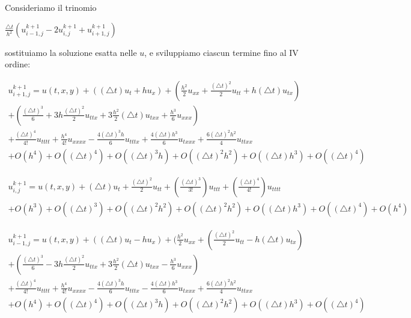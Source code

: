 \documentclass[]{article}
\begin{document}
Consideriamo il trinomio
\begin{center}
	$\frac{\bigtriangleup t}{h^2} (u^{k+1}_{i-1,j} -2u^{k+1}_{i,j} + u^{k+1}_{i+1,j})$
\end{center}
sostituiamo la soluzione esatta nelle $u$, e sviluppiamo ciascun termine fino al IV ordine:

\begin{equation}
\begin{split}
	u^{k+1}_{i+1,j} = u(t,x,y) + ((\bigtriangleup t) u_t + h u_x) + (\frac{h^2}{2} u_{xx} + \frac{(\bigtriangleup t)^2}{2} u_{tt} + h (\bigtriangleup t) u_{tx})\\ + (\frac{(\bigtriangleup t)^3}{6} + 3h \frac{(\bigtriangleup t)^2}{2} u_{ttx}  + 3\frac{h^2}{2} (\bigtriangleup t) u_{txx} + \frac{h^3}{6} u_{xxx})\\ + \frac{(\bigtriangleup t)^4}{4!} u_{tttt} + \frac{h^4}{4!} u_{xxxx} - \frac{4 (\bigtriangleup t)^3 h}{6} u_{tttx} + \frac{4 (\bigtriangleup t) h^3}{6} u_{txxx} + \frac{6 (\bigtriangleup t)^2 h^2}{4} u_{ttxx}\\ + O(h^4) + O((\bigtriangleup t)^4) + O((\bigtriangleup t)^3 h) + O((\bigtriangleup t)^2 h^2) + O((\bigtriangleup t) h^3) + O((\bigtriangleup t)^4)
\end{split}
\end{equation}

\begin{equation}
\begin{split}
u^{k+1}_{i,j} = u(t,x,y) + (\bigtriangleup t) u_t + \frac{(\bigtriangleup t)^2}{2} u_{tt} + (\frac{(\bigtriangleup t)^3}{3!}) u_{ttt} + (\frac{(\bigtriangleup t)^4}{4!}) u_{tttt}\\ + O(h^3) + O((\bigtriangleup t)^3) + O((\bigtriangleup t)^2 h^2) + O((\bigtriangleup t)^2 h^2) + O((\bigtriangleup t) h^3) + O((\bigtriangleup t)^4) + O(h^4)
\end{split}
\end{equation}

\begin{equation}
\begin{split}
u^{k+1}_{i-1,j} = u(t,x,y) + ((\bigtriangleup t) u_t - h u_x) + (\frac{h^2}{2} u_{xx} + (\frac{(\bigtriangleup t)^2}{2} u_{tt} - h (\bigtriangleup t) u_{tx}) \\+ (\frac{(\bigtriangleup t)^3}{6} - 3h \frac{(\bigtriangleup t)^2}{2} u_{ttx}  + 3\frac{h^2}{2} (\bigtriangleup t) u_{txx} - \frac{h^3}{6} u_{xxx})\\ + \frac{(\bigtriangleup t)^4}{4!} u_{tttt} + \frac{h^4}{4!} u_{xxxx} - \frac{4 (\bigtriangleup t)^3 h}{6} u_{tttx} - \frac{4 (\bigtriangleup t) h^3}{6} u_{txxx} + \frac{6 (\bigtriangleup t)^2 h^2}{4} u_{ttxx}\\ + O(h^4) + O((\bigtriangleup t)^4) + O((\bigtriangleup t)^3 h) + O((\bigtriangleup t)^2 h^2) + O((\bigtriangleup t) h^3) + O((\bigtriangleup t)^4)
\end{split}
\end{equation}
\end{document}
